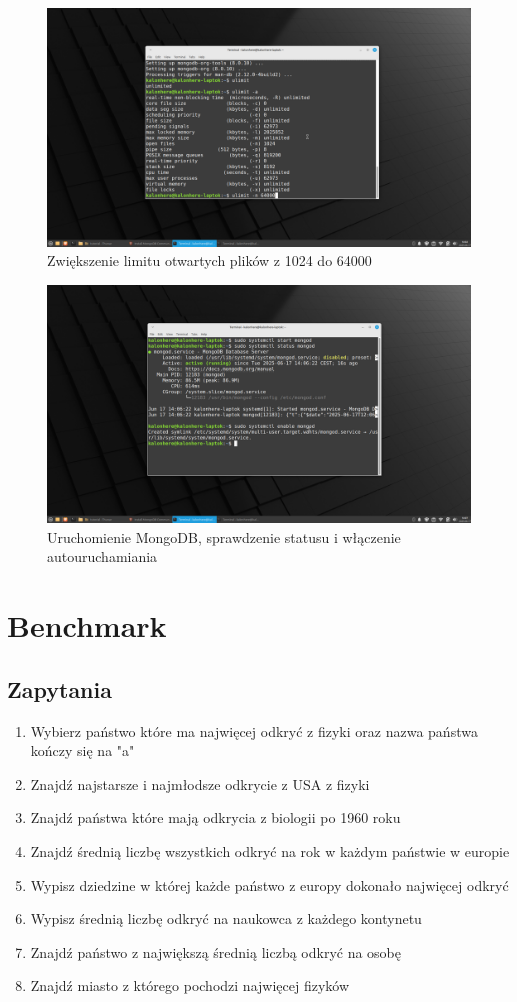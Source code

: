 \documentclass[11pt]{article}
\begin{document}
		\begin{figure}
			\includegraphics[width=\textwidth]{7_zmiana_ustawien_dotyczacych_plikow.png}
			\caption{Zwiększenie limitu otwartych plików z 1024 do 64000}
		\end{figure}
		\begin{figure}
			\includegraphics[width=\textwidth]{8_uruchomienie_sprawdzenie_i_aktywacja_autouruchamiania_mongodb.png}
			\caption{Uruchomienie MongoDB, sprawdzenie statusu i włączenie autouruchamiania}
		\end{figure}
\section{Benchmark}
	\subsection{Zapytania}
		\begin{enumerate}
			\item Wybierz państwo które ma najwięcej odkryć z fizyki oraz nazwa państwa kończy się na "a"
			\item Znajdź najstarsze i najmłodsze odkrycie z USA z fizyki
			\item Znajdź państwa które mają odkrycia z biologii po 1960 roku
			\item Znajdź średnią liczbę wszystkich odkryć na rok w każdym państwie w europie
			\item Wypisz dziedzine w której każde państwo z europy dokonało najwięcej odkryć
			\item Wypisz średnią liczbę odkryć na naukowca z każdego kontynetu
			\item Znajdź państwo z największą średnią liczbą odkryć na osobę
			\item Znajdź miasto z którego pochodzi najwięcej fizyków
		\end{enumerate}
\end{document}
